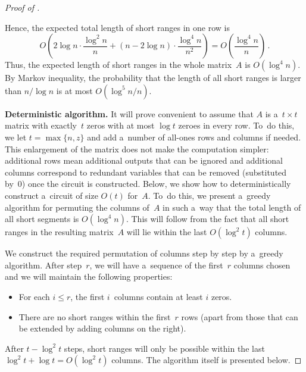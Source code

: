 \documentclass{toc}
\begin{document}
\begin{proof}[Proof of {}]
\begin{enumerate}
    \end{enumerate}
    Hence, the expected total length of short ranges in one row is
    \[O\left( 2\log n \cdot \frac{\log^2 n}{n} + (n-2\log n) \cdot \frac{\log^4 n}{n^2}\right)=O\left(\frac{\log^4 n}{n}\right) \, .\]
    Thus, the expected length of short ranges in the whole
    matrix~$A$ is $O(\log^4n)$. By Markov inequality, the probability that
    the length of all short ranges is larger than $n/\log n$ is
    at most $O(\log^5 n/n)$.

    \textbf{Deterministic algorithm.}
    It will prove convenient to assume that $A$ is a~$t \times t$ matrix with
    exactly~$t$ zeros with at most $\log t$ zeroes in every row. To~do this, we let
    $t=\max\{n, z\}$ and add a~number of all-ones rows and columns if needed. This
    enlargement of the matrix does not make the computation simpler: additional rows
    mean additional outputs that can be ignored and additional columns correspond to
    redundant variables that can be removed (substituted by~0) once the circuit is
    constructed. Below, we show how to deterministically construct a~circuit of size
    $O(t)$ for~$A$. To~do this, we present a~greedy algorithm for permuting the
    columns of~$A$ in such a~way that the total length of all short segments
    is $O(\log^4n)$. This will follow from the fact that all short ranges in the
    resulting matrix~$A$ will lie within the last $O(\log^2 t)$ columns.

    We construct the required permutation of columns step by step by a~greedy
    algorithm. After step~$r$, we will have a~sequence of the first~$r$ columns
    chosen and we will maintain the following properties:
    \begin{itemize}
        \item For each $i \leq r$, the first $i$~columns contain at least $i$ zeros.
        \item There are no short ranges within the first~$r$ rows (apart from those
        that can be extended by adding columns on the right).
    \end{itemize}

    After $t - \log^2 t$ steps, short ranges will only be possible within the last
    $\log^2 t + \log t = O(\log^2 t)$ columns. The algorithm itself is presented
    below.


\end{proof}
\end{document}
